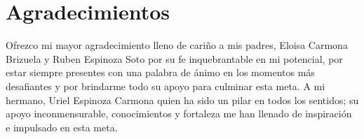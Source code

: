 \documentclass[12 pt, letter, oneside]{book}
\begin{document}


\tableofcontents 
\newpage
\listoffigures
\newpage
\listoftables
\newpage
\titleformat{\chapter}[display]
  {\normalfont\bfseries}{}{0pt}{\Large}
\chapter*{Agradecimientos}

Ofrezco mi mayor agradecimiento lleno de cariño a mis padres, Eloisa Carmona Brizuela y Ruben Espinoza Soto por su fe inquebrantable en mi potencial, por estar siempre presentes con una palabra de ánimo en los momentos más desafiantes y por brindarme todo su apoyo para culminar esta meta. A mi hermano, Uriel Espinoza Carmona quien ha sido un pilar en todos los sentidos; su apoyo inconmensurable, conocimientos y fortaleza me han llenado de inspiración e impulsado en esta meta. 
\end{document}
